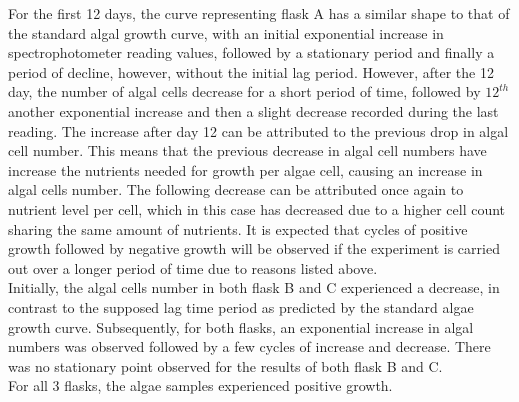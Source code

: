 \documentclass[12pt,a4paper]{article}
\begin{document}
    For the first 12 days, the curve representing flask A has a similar shape to that of the standard algal growth curve, with an initial exponential increase in spectrophotometer reading values, followed by a stationary period and finally a period of decline, however, without the initial lag period. However, after the 12 day, the number of algal cells decrease for a short period of time, followed by $12^{th}$ another exponential increase and then a slight decrease recorded during the last reading. The increase after day 12 can be attributed to the previous drop in algal cell number. This means that the previous decrease in algal cell numbers have increase the nutrients needed for growth per algae cell, causing an increase in algal cells number. The following decrease can be attributed once again to nutrient level per cell, which in this case has decreased due to a higher cell count sharing the same amount of nutrients. It is expected that cycles of positive growth followed by negative growth will be observed if the experiment is carried out over a longer period of time due to reasons listed above. \\
    
    Initially, the algal cells number in both flask B and C experienced a decrease, in contrast to the supposed lag time period as predicted by the standard algae growth curve. Subsequently, for both flasks, an exponential increase in algal numbers was observed followed by a few cycles of increase and decrease. There was no stationary point observed for the results of both flask B and C. \\
    
    For all 3 flasks, the algae samples experienced positive growth.
    
\end{document}
